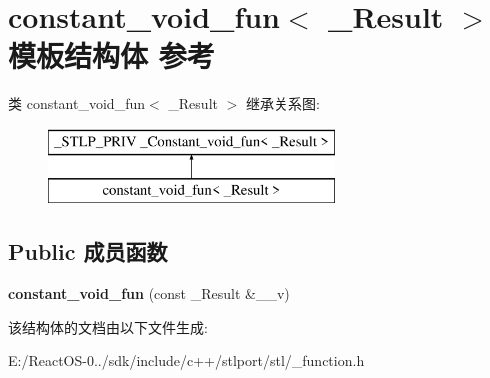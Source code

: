 \hypertarget{structconstant__void__fun}{}\section{constant\+\_\+void\+\_\+fun$<$ \+\_\+\+Result $>$ 模板结构体 参考}
\label{structconstant__void__fun}
类 constant\+\_\+void\+\_\+fun$<$ \+\_\+\+Result $>$ 继承关系图\+:\begin{figure}[H]
\begin{center}
\leavevmode
\includegraphics[height=2.000000cm]{structconstant__void__fun}
\end{center}
\end{figure}
\subsection*{Public 成员函数}
\begin{DoxyCompactItemize}
\item 
\mbox{\label{structconstant__void__fun_a896b8388314e87760bd173376f63a198}} 
{\bfseries constant\+\_\+void\+\_\+fun} (const \+\_\+\+Result \&\+\_\+\+\_\+v)
\end{DoxyCompactItemize}


该结构体的文档由以下文件生成\+:\begin{DoxyCompactItemize}
\item 
E\+:/\+React\+O\+S-\/0../sdk/include/c++/stlport/stl/\+\_\+function.\+h\end{DoxyCompactItemize}
